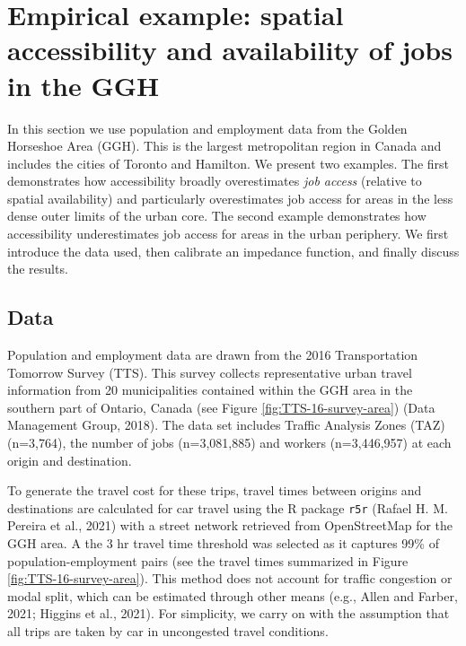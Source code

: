 \documentclass[]{elsarticle} %
\begin{document}
\hypertarget{empirical-example-spatial-accessibility-and-availability-of-jobs-in-the-ggh}{%
\section{Empirical example: spatial accessibility and availability of
jobs in the
GGH}\label{empirical-example-spatial-accessibility-and-availability-of-jobs-in-the-ggh}}

In this section we use population and employment data from the Golden
Horseshoe Area (GGH). This is the largest metropolitan region in Canada
and includes the cities of Toronto and Hamilton. We present two
examples. The first demonstrates how accessibility broadly overestimates
\emph{job access} (relative to spatial availability) and particularly
overestimates job access for areas in the less dense outer limits of the
urban core. The second example demonstrates how accessibility
underestimates job access for areas in the urban periphery. We first
introduce the data used, then calibrate an impedance function, and
finally discuss the results.

\hypertarget{data}{%
\subsection{Data}\label{data}}

Population and employment data are drawn from the 2016 Transportation
Tomorrow Survey (TTS). This survey collects representative urban travel
information from 20 municipalities contained within the GGH area in the
southern part of Ontario, Canada (see Figure
\ref{fig:TTS-16-survey-area}) (Data Management Group, 2018). The data
set includes Traffic Analysis Zones (TAZ) (n=3,764), the number of jobs
(n=3,081,885) and workers (n=3,446,957) at each origin and destination.

To generate the travel cost for these trips, travel times between
origins and destinations are calculated for car travel using the R
package \texttt{r5r} (Rafael H. M. Pereira et al., 2021) with a street
network retrieved from OpenStreetMap for the GGH area. A the 3 hr travel
time threshold was selected as it captures 99\% of population-employment
pairs (see the travel times summarized in Figure
\ref{fig:TTS-16-survey-area}). This method does not account for traffic
congestion or modal split, which can be estimated through other means
(e.g., Allen and Farber, 2021; Higgins et al., 2021). For simplicity, we
carry on with the assumption that all trips are taken by car in
uncongested travel conditions.
\end{document}
